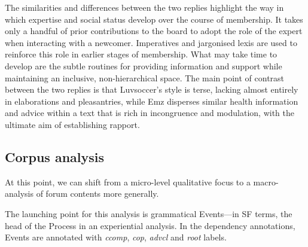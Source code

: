 \documentclass{article}
\begin{document}
The similarities and differences between the two replies highlight the way in which expertise and social status develop over the course of membership. It takes only a handful of prior contributions to the board to adopt the role of the expert when interacting with a newcomer. Imperatives and jargonised lexis are used to reinforce this role in earlier stages of membership. What may take time to develop are the subtle routines for providing information and support while maintaining an inclusive, non-hierarchical space. The main point of contrast between the two replies is that Luvsoccer's style is terse, lacking almost entirely in elaborations and pleasantries, while Emz disperses similar health information and advice within a text that is rich in incongruence and modulation, with the ultimate aim of establishing rapport.



\subsection{Corpus analysis}

At this point, we can shift from a micro-level qualitative focus to a macro-analysis of forum contents more generally.

The launching point for this analysis is grammatical Events---in SF terms, the head of the Process in an experiential analysis. In the dependency annotations, Events are annotated with \emph{ccomp}, \emph{cop}, \emph{advcl} and \emph{root} labels.
\end{document}
